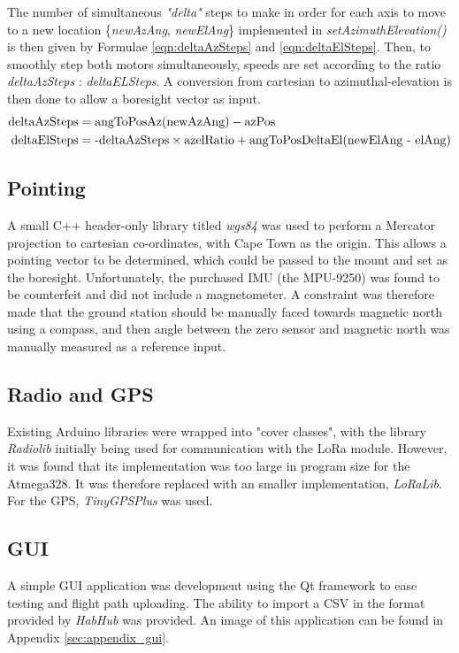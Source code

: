 \noindent The number of simultaneous \textit{"delta"} steps to make in order for each axis to move to a new location \{\textit{newAzAng}, \textit{newElAng}\} implemented in \textit{setAzimuthElevation()} is then given by Formulae \ref{eqn:deltaAzSteps} and \ref{eqn:deltaElSteps}. Then, to smoothly step both motors simultaneously, speeds are set according to the ratio \textit{deltaAzSteps} : \textit{deltaELSteps}. A conversion from cartesian to azimuthal-elevation is then done to allow a boresight vector as input.
\begin{align}
    \textnormal{deltaAzSteps} &= \textnormal{angToPosAz(newAzAng)} - \textnormal{azPos} \label{eqn:deltaAzSteps} \\ 
    \textnormal{deltaElSteps} &= \textnormal{-deltaAzSteps} \times \textnormal{azelRatio} + \textnormal {angToPosDeltaEl(newElAng - elAng)}\label{eqn:deltaElSteps} 
\end{align}

\subsection{Pointing}
A small C++ header-only library titled \textit{wgs84} was used to perform a Mercator projection to cartesian co-ordinates, with Cape Town as the origin. This allows a pointing vector to be determined, which could be passed to the mount and set as the boresight. Unfortunately, the purchased IMU (the MPU-9250) was found to be counterfeit and did not include a magnetometer. A constraint was therefore made that the ground station should be manually faced towards magnetic north using a compass, and then angle between the zero sensor and magnetic north was manually measured as a reference input.

\subsection{Radio and GPS}
Existing Arduino libraries were wrapped into "cover classes", with the library \textit{Radiolib} initially being used for communication with the LoRa module. However, it was found that its implementation was too large in program size for the Atmega328. It was therefore replaced with an smaller implementation, \textit{LoRaLib}. For the GPS, \textit{TinyGPSPlus} was used.

\subsection{GUI}
A simple GUI application was development using the Qt framework to ease testing and flight path uploading. The ability to import a CSV in the format provided by \textit{HabHub} was provided. An image of this application can be found in Appendix \ref{sec:appendix_gui}.